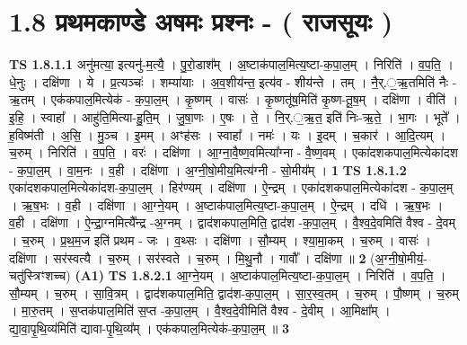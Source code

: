 \documentclass[17pt]{extarticle}
\begin{document}
\section*{ 1.8     प्रथमकाण्डे अषमः प्रश्नः - ( राजसूयः ) }
                                \textbf{ TS 1.8.1.1} \newline
                  अनु॑मत्या॒ इत्यनु॑-म॒त्यै॒ । पु॒रो॒डाश᳚म् । अ॒ष्टाक॑पाल॒मित्य॒ष्टा-क॒पा॒ल॒म् । निरिति॑ । व॒प॒ति॒ । धे॒नुः । दक्षि॑णा । ये । प्र॒त्यञ्चः॑ । शम्या॑याः । अ॒व॒शीय॑न्त॒ इत्य॑व - शीय॑न्ते । तम् । नै॒र्.॒ऋ॒तमिति॑ नैः - ऋ॒तम् । एक॑कपाल॒मित्येक॑ - क॒पा॒ल॒म् । कृ॒ष्णम् । वासः॑ । कृ॒ष्णतू॑ष॒मिति॑ कृ॒ष्ण-तू॒ष॒म् । दक्षि॑णा । वीति॑ । इ॒हि॒ । स्वाहा᳚ । आहु॑ति॒मित्या-हु॒ति॒म् । जु॒षा॒णः । ए॒षः । ते॒ । नि॒र्.॒ऋ॒त॒ इति॑ निः-ऋ॒ते॒ । भा॒गः । भूते᳚ । ह॒विष्म॑ती । अ॒सि॒ । मु॒ञ्च । इ॒मम् । अꣳह॑सः । स्वाहा᳚ । नमः॑ । यः । इ॒दम् । च॒कार॑ । आ॒दि॒त्यम् । च॒रुम् । निरिति॑ । व॒प॒ति॒ । वरः॑ । दक्षि॑णा । आ॒ग्ना॒वै॒ष्ण॒वमित्या᳚ग्ना - वै॒ष्ण॒वम् । एका॑दशकपाल॒मित्येका॑दश - क॒पा॒ल॒म् । वा॒म॒नः । व॒ही । दक्षि॑णा । अ॒ग्नी॒षो॒मीय॒मित्य॑ग्नी - सो॒मीय᳚म् । \textbf{  1} \newline
                  \newline
                                \textbf{ TS 1.8.1.2} \newline
                  एका॑दशकपाल॒मित्येका॑दश-क॒पा॒ल॒म् । हिर॑ण्यम् । दक्षि॑णा । ऐ॒न्द्रम् । एका॑दशकपाल॒मित्येका॑दश - क॒पा॒ल॒म् । ऋ॒ष॒भः । व॒ही । दक्षि॑णा । आ॒ग्ने॒यम् । अ॒ष्टाक॑पाल॒मित्य॒ष्टा-क॒पा॒ल॒म् । ऐ॒न्द्रम् । दधि॑ । ऋ॒ष॒भः । व॒ही । दक्षि॑णा । ऐ॒न्द्रा॒ग्नमित्यै᳚न्द्र -अ॒ग्नम् । द्वाद॑शकपाल॒मिति॒ द्वाद॑श -क॒पा॒ल॒म् । वै॒श्व॒दे॒वमिति॑ वैश्व - दे॒वम् । च॒रुम् । प्र॒थ॒म॒ज इति॑ प्रथम - जः । व॒थ्सः । दक्षि॑णा । सौ॒म्यम् । श्या॒मा॒कम् । च॒रुम् । वासः॑ । दक्षि॑णा । सर॑स्वत्यै । च॒रुम् । सर॑स्वते । च॒रुम् । मि॒थु॒नौ । गावौ᳚ । दक्षि॑णा ॥ \textbf{  2} \newline
                  \newline
                      (अ॒ग्नी॒षो॒मीयं॒-चतु॑स्त्रिꣳशच्च)  \textbf{(A1)} \newline \newline
                                \textbf{ TS 1.8.2.1} \newline
                  आ॒ग्ने॒यम् । अ॒ष्टाक॑पाल॒मित्य॒ष्टा-क॒पा॒ल॒म् । निरिति॑ । व॒प॒ति॒ । सौ॒म्यम् । च॒रुम् । सा॒वि॒त्रम् । द्वाद॑शकपाल॒मिति॒ द्वाद॑श-क॒पा॒ल॒म् । सा॒र॒स्व॒तम् । च॒रुम् । पौ॒ष्णम् । च॒रुम् । मा॒रु॒तम् । स॒प्तक॑पाल॒मिति॑ स॒प्त -क॒पा॒ल॒म् । वै॒श्व॒दे॒वीमिति॑ वैश्व - दे॒वीम् । आ॒मिक्षा᳚म् । द्या॒वा॒पृ॒थि॒व्य॑मिति॑ द्यावा-पृ॒थि॒व्य᳚म् । एक॑कपाल॒मित्येक॑-क॒पा॒ल॒म् ॥ \textbf{  3} \newline
\end{document}
